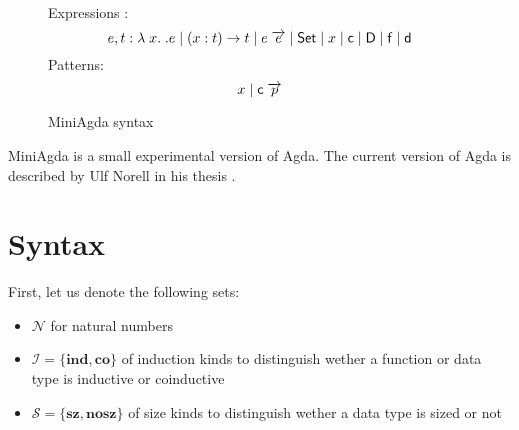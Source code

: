 \newcommand{\sleqinfty}{\rulename{sleq-infty}}

\newcommand{\sleqsucci}{\rulename{sleq-succ-i}}
\newcommand{\sleqsuccii}{\rulename{sleq-succ-ii}}
\newcommand{\sleqgen}{\rulename{sleq-gen}}

\newcommand{\dd}{\mathsf{d}}
\newcommand{\DD}{\mathsf{D}}
\newcommand{\cc}{\mathsf{c}}
\newcommand{\ff}{\mathsf{f}}

\newcommand{\cll}{\mathcal{L}}
\newcommand{\cdd}{\mathcal{D}}
\newcommand{\ccc}{\mathcal{C}}
\newcommand{\cff}{\mathcal{F}}
\newcommand{\cV}{\mathcal{V}}

\newcommand{\cS}{\mathcal{S}}
\newcommand{\cN}{\mathcal{N}}
\newcommand{\cI}{\mathcal{I}}
\newcommand{\cF}{\mathcal{F}}
\newcommand{\nF}{\mathbf{N}}
\newcommand{\lF}{\mathbf{L}}
\newcommand{\rF}{\mathbf{R}}

\newcommand{\sz}{\mathbf{sz}}
\newcommand{\ns}{\mathbf{nosz}}
\newcommand{\co}{\mathbf{co}}
\newcommand{\ind}{\mathbf{ind}}

\newcommand{\Expr}{\mathrm{Expr}}
\newcommand{\Val}{\mathrm{Val}}
\newcommand{\vlam}{\mathrm{Lam}}
\newcommand{\vpi}{\mathrm{Pi}}
\newcommand{\Clos}{\mathrm{Clos}}
\newcommand{\Env}{\mathrm{Env}}
\newcommand{\wh}{\mathrm{eval}}
\newcommand{\ap}{\mathrm{app}}
\newcommand{\apf}{\mathrm{appFun}}
\newcommand{\sinfty}{\mathrm{sinfty}}
\newcommand{\lkup}{\mathrm{lkup}}
\newcommand{\ins}{\mathrm{ins}}
\newcommand{\forc}{\mathrm{force}}
\newcommand{\matchcls}{\mathrm{matchcls}}
\newcommand{\matchcl}{\mathrm{matchcl}}
\newcommand{\match}{\mathrm{match}}
\newcommand{\matchf}{\mathrm{match'}}
\newcommand{\matchList}{\mathrm{matchList}}
\newcommand{\matchInfty}{\mathrm{matchInfty}}
\newcommand{\nothing}{\;\Uparrow}
\newcommand{\Clause}{\mathrm{Clause}}
\newcommand{\Decl}{\mathrm{Decl}}
\newcommand{\Pat}{\mathrm{Pat}}

\newcommand{\Sig}{\mathrm{\Sigma}}

\begin{figure}[p]
\caption{MiniAgda syntax}
Expressions : \[e,t :  \lam x . e \vsp \EPi{x}{t}{t} \vsp e \; \vec{e} \vsp  \Set \vsp x \vsp \cc \vsp \DD \vsp \ff \vsp \dd\]
Patterns: \[ x  \vsp \cc \; \vec{p} \]
\end{figure}

MiniAgda is a small experimental version of Agda.
The current version of Agda is described by Ulf Norell in his thesis \cite{norell:thesis}.



\section{Syntax}
First, let us denote the following sets:
\begin{itemize}
\item
$ \cN $ for natural numbers
\item
$ \cI = \{ \ind , \co \} $ of induction kinds to distinguish wether a function or data type is 
inductive or coinductive  
\item
$ \cS = \{ \sz, \ns \} $ of size kinds to distinguish wether a data type is sized or not
\end{itemize}

